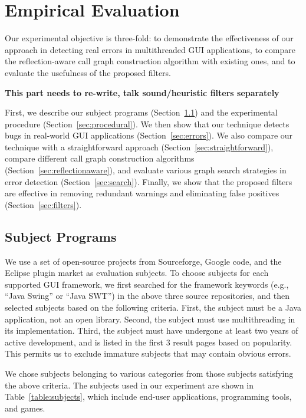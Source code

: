 \section{Empirical Evaluation}
\label{sec:evaluation}

Our experimental objective is three-fold: to demonstrate the effectiveness
of our approach in detecting real errors in multithreaded GUI applications, to 
compare the reflection-aware call graph construction algorithm
with existing ones, and to evaluate the usefulness of the proposed 
 filters.  

\textbf{This part needs to re-write, talk sound/heuristic filters separately}

First, we describe our subject programs (Section~\ref{sec:subjects}) and the experimental procedure (Section~\ref{sec:procedural}).
We then show that our technique detects bugs in real-world GUI applications (Section~\ref{sec:errors}).
We also compare our technique with
a straightforward approach (Section~\ref{sec:straightforward}),  compare
different call graph construction algorithms (Section~\ref{sec:reflectionaware}), and
evaluate various graph search strategies in error detection (Section~\ref{sec:search}).
 Finally, we show that the proposed filters are effective
in removing redundant warnings and eliminating
false positives (Section~\ref{sec:filters}). 



\subsection{Subject Programs}
\label{sec:subjects}


We use a set of open-source projects from Sourceforge, Google code,
and the Eclipse plugin
market as evaluation subjects. To choose subjects for each supported GUI framework,
we first searched for the framework keywords (e.g., ``Java Swing'' or ``Java SWT'')
in the above three source repositories, and then selected subjects based on the following
criteria. First, the subject must be a Java application, not
an open library. Second, the subject must use multithreading in its implementation.
Third, the subject must have undergone at least two years of active development,
and is listed in the first 3 result pages based on popularity. This permits us
to exclude immature subjects that may contain obvious errors.

We chose subjects belonging to various categories from those subjects satisfying
the above criteria. The subjects used in our experiment are shown in Table~\ref{table:subjects},
which include end-user applications, programming tools, and games. 


